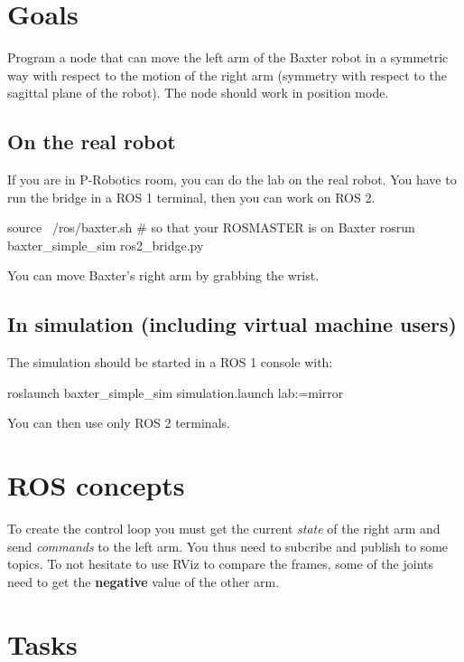 \documentclass{ecnreport}
\author{O. Kermorgant}
\begin{document}


\section{Goals}

Program a node that can move the left arm of the Baxter robot in a symmetric way with respect to
the motion of the right arm (symmetry with respect to the sagittal plane of the robot).
The node should work in position mode. \\

\subsection{On the real robot}

If you are in P-Robotics room, you can do the lab on the real robot. You have to run the bridge in a ROS 1 terminal, then you can work on ROS 2.

\begin{bashcodelarge}
 source ~/ros/baxter.sh # so that your ROSMASTER is on Baxter
 rosrun baxter_simple_sim ros2_bridge.py
\end{bashcodelarge}

You can move Baxter's right arm by grabbing the wrist.

\subsection{In simulation (including virtual machine users)}
The simulation should be started in a ROS 1 console with:
\begin{bashcodelarge}
 roslaunch baxter_simple_sim simulation.launch lab:=mirror
\end{bashcodelarge}
You can then use only ROS 2 terminals.


\section{ROS concepts}

To create the control loop you must get the current \emph{state} of the right arm and send \emph{commands} to 
the left arm. You thus need to subcribe and publish to some topics. To not hesitate to use RViz to compare the frames, some of the joints need to get the \textbf{negative}
value of the other arm.

\section{Tasks}
\end{document}
